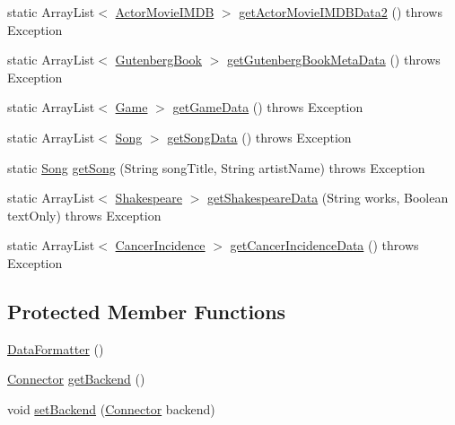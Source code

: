 \begin{DoxyCompactItemize}
\item 
static Array\+List$<$ \mbox{\hyperlink{classbridges_1_1data__src__dependent_1_1_actor_movie_i_m_d_b}{Actor\+Movie\+I\+M\+DB}} $>$ \mbox{\hyperlink{classbridges_1_1connect_1_1_data_formatter_a9b599616c4d7a502f9fab8663173db6d}{get\+Actor\+Movie\+I\+M\+D\+B\+Data2}} ()  throws Exception 
\item 
static Array\+List$<$ \mbox{\hyperlink{classbridges_1_1data__src__dependent_1_1_gutenberg_book}{Gutenberg\+Book}} $>$ \mbox{\hyperlink{classbridges_1_1connect_1_1_data_formatter_a4bd21bd830238db40b511474afc77b61}{get\+Gutenberg\+Book\+Meta\+Data}} ()  throws Exception 
\item 
static Array\+List$<$ \mbox{\hyperlink{classbridges_1_1data__src__dependent_1_1_game}{Game}} $>$ \mbox{\hyperlink{classbridges_1_1connect_1_1_data_formatter_a4098317468be22b4284156d6cd2212e1}{get\+Game\+Data}} ()  throws Exception 
\item 
static Array\+List$<$ \mbox{\hyperlink{classbridges_1_1data__src__dependent_1_1_song}{Song}} $>$ \mbox{\hyperlink{classbridges_1_1connect_1_1_data_formatter_a6a2ded4ccec11234434b83a3e408fb67}{get\+Song\+Data}} ()  throws Exception 
\item 
static \mbox{\hyperlink{classbridges_1_1data__src__dependent_1_1_song}{Song}} \mbox{\hyperlink{classbridges_1_1connect_1_1_data_formatter_ad1d2071025ce9daa42ab69af8eb4749b}{get\+Song}} (String song\+Title, String artist\+Name)  throws Exception 
\item 
static Array\+List$<$ \mbox{\hyperlink{classbridges_1_1data__src__dependent_1_1_shakespeare}{Shakespeare}} $>$ \mbox{\hyperlink{classbridges_1_1connect_1_1_data_formatter_ac090a4d67b38b9649bf811906f9a630a}{get\+Shakespeare\+Data}} (String works, Boolean text\+Only)  throws Exception 
\item 
static Array\+List$<$ \mbox{\hyperlink{classbridges_1_1data__src__dependent_1_1_cancer_incidence}{Cancer\+Incidence}} $>$ \mbox{\hyperlink{classbridges_1_1connect_1_1_data_formatter_af26cb09a93bf326fe14ad8fecf46b4f8}{get\+Cancer\+Incidence\+Data}} ()  throws Exception 
\end{DoxyCompactItemize}
\subsection*{Protected Member Functions}
\begin{DoxyCompactItemize}
\item 
\mbox{\hyperlink{classbridges_1_1connect_1_1_data_formatter_a31efd2251e98942e58e743dff213ef27}{Data\+Formatter}} ()
\item 
\mbox{\hyperlink{classbridges_1_1connect_1_1_connector}{Connector}} \mbox{\hyperlink{classbridges_1_1connect_1_1_data_formatter_a29cf4c2b0c5629d63a76b60569355c65}{get\+Backend}} ()
\item 
void \mbox{\hyperlink{classbridges_1_1connect_1_1_data_formatter_af9b878e5c092234a6ab5f8c11bee1fbd}{set\+Backend}} (\mbox{\hyperlink{classbridges_1_1connect_1_1_connector}{Connector}} backend)
\end{DoxyCompactItemize}


